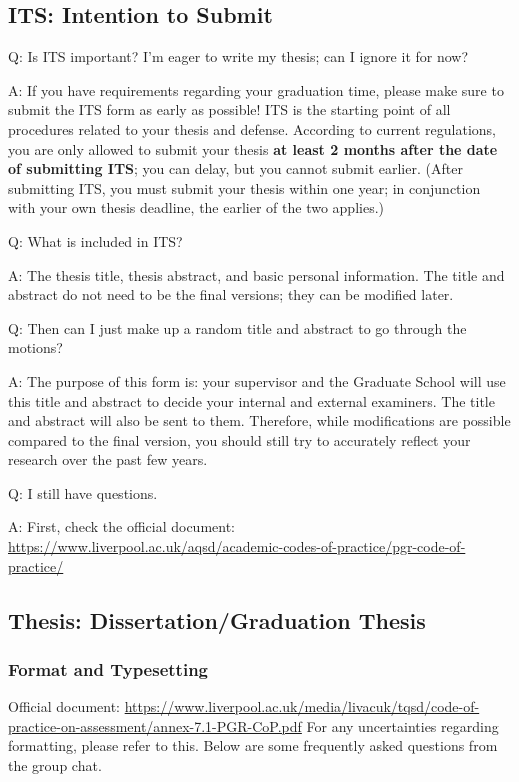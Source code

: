 \subsection{ITS: Intention to Submit}

Q: Is ITS important? I'm eager to write my thesis; can I ignore it for now?

A: If you have requirements regarding your graduation time, please make sure to submit the ITS form as early as possible! ITS is the starting point of all procedures related to your thesis and defense. According to current regulations, you are only allowed to submit your thesis \textbf{at least 2 months after the date of submitting ITS}; you can delay, but you cannot submit earlier. (After submitting ITS, you must submit your thesis within one year; in conjunction with your own thesis deadline, the earlier of the two applies.)

Q: What is included in ITS?

A: The thesis title, thesis abstract, and basic personal information. The title and abstract do not need to be the final versions; they can be modified later.

Q: Then can I just make up a random title and abstract to go through the motions?

A: The purpose of this form is: your supervisor and the Graduate School will use this title and abstract to decide your internal and external examiners. The title and abstract will also be sent to them. Therefore, while modifications are possible compared to the final version, you should still try to accurately reflect your research over the past few years.

Q: I still have questions.

A: First, check the official document: \url{https://www.liverpool.ac.uk/aqsd/academic-codes-of-practice/pgr-code-of-practice/}

\subsection{Thesis: Dissertation/Graduation Thesis}

\subsubsection{Format and Typesetting}

Official document: \url{https://www.liverpool.ac.uk/media/livacuk/tqsd/code-of-practice-on-assessment/annex-7.1-PGR-CoP.pdf}
\newline
For any uncertainties regarding formatting, please refer to this. Below are some frequently asked questions from the group chat.


